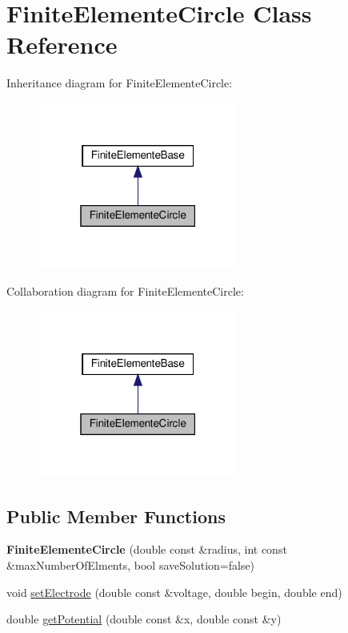 \hypertarget{classFiniteElementeCircle}{}\section{Finite\+Elemente\+Circle Class Reference}
\label{classFiniteElementeCircle}


Inheritance diagram for Finite\+Elemente\+Circle\+:\nopagebreak
\begin{figure}[H]
\begin{center}
\leavevmode
\includegraphics[width=187pt]{classFiniteElementeCircle__inherit__graph}
\end{center}
\end{figure}


Collaboration diagram for Finite\+Elemente\+Circle\+:\nopagebreak
\begin{figure}[H]
\begin{center}
\leavevmode
\includegraphics[width=187pt]{classFiniteElementeCircle__coll__graph}
\end{center}
\end{figure}
\subsection*{Public Member Functions}
\begin{DoxyCompactItemize}
\item 
\mbox{\label{classFiniteElementeCircle_aef00567cba0a679abd3dee1c26b91c8b}} 
{\bfseries Finite\+Elemente\+Circle} (double const \&radius, int const \&max\+Number\+Of\+Elments, bool save\+Solution=false)
\item 
void \hyperlink{classFiniteElementeCircle_aa3b2b0e50ab5ba53431bdc80674ead26}{set\+Electrode} (double const \&voltage, double begin, double end)
\item 
double \hyperlink{classFiniteElementeCircle_a832520dcd5db9bd2845ad3c781749a69}{get\+Potential} (double const \&x, double const \&y)
\end{DoxyCompactItemize}
